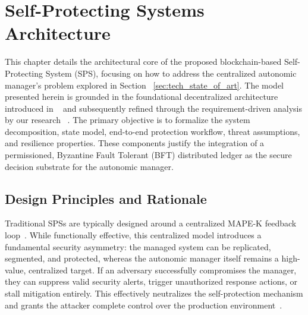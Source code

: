 
\chapter{Self-Protecting Systems Architecture}
\label{chap:sps_architecture}

This chapter details the architectural core of the proposed blockchain-based Self-Protecting System (SPS), focusing on how to address the centralized autonomic manager's problem explored in Section ~\ref{sec:tech_state_of_art}. The model presented herein is grounded in the foundational decentralized architecture introduced in ~\cite{albero2026blockchain} and subsequently refined through the requirement-driven analysis by our research ~\cite{albero2026blockchain}. The primary objective is to formalize the system decomposition, state model, end-to-end protection workflow, threat assumptions, and resilience properties. These components justify the integration of a permissioned, Byzantine Fault Tolerant (BFT) distributed ledger as the secure decision substrate for the autonomic manager.

\section{Design Principles and Rationale}
\label{sec:design_principles}

Traditional SPSs are typically designed around a centralized MAPE-K feedback loop~\cite{kephart2003vision}. While functionally effective, this centralized model introduces a fundamental security asymmetry: the managed system can be replicated, segmented, and protected, whereas the autonomic manager itself remains a high-value, centralized target. If an adversary successfully compromises the manager, they can suppress valid security alerts, trigger unauthorized response actions, or stall mitigation entirely. This effectively neutralizes the self-protection mechanism and grants the attacker complete control over the production environment~\cite{chess2003security, pekaric2023systematic}.

